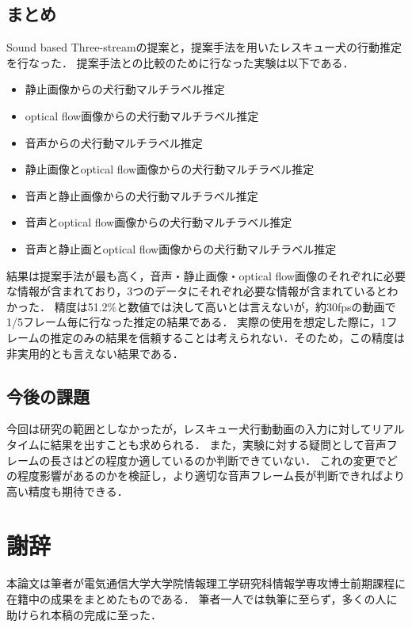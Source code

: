 \section{まとめ}
Sound based Three-streamの提案と，提案手法を用いたレスキュー犬の行動推定を行なった．
提案手法との比較のために行なった実験は以下である．
\begin{itemize}
  \item 静止画像からの犬行動マルチラベル推定
  \item optical flow画像からの犬行動マルチラベル推定
  \item 音声からの犬行動マルチラベル推定
  \item 静止画像とoptical flow画像からの犬行動マルチラベル推定
  \item 音声と静止画像からの犬行動マルチラベル推定
  \item 音声とoptical flow画像からの犬行動マルチラベル推定
  \item 音声と静止画とoptical flow画像からの犬行動マルチラベル推定
\end{itemize}
結果は提案手法が最も高く，音声・静止画像・optical flow画像のそれぞれに必要な情報が含まれており，3つのデータにそれぞれ必要な情報が含まれているとわかった．
精度は51.2\%と数値では決して高いとは言えないが，約30fpsの動画で1/5フレーム毎に行なった推定の結果である．
実際の使用を想定した際に，1フレームの推定のみの結果を信頼することは考えられない．そのため，この精度は非実用的とも言えない結果である．


\section{今後の課題}
今回は研究の範囲としなかったが，レスキュー犬行動動画の入力に対してリアルタイムに結果を出すことも求められる．
また，実験に対する疑問として音声フレームの長さはどの程度か適しているのか判断できていない．
これの変更でどの程度影響があるのかを検証し，より適切な音声フレーム長が判断できればより高い精度も期待できる．

%


% 
% 

\chapter*{謝辞}
本論文は筆者が電気通信大学大学院情報理工学研究科情報学専攻博士前期課程に在籍中の成果をまとめたものである．
筆者一人では執筆に至らず，多くの人に助けられ本稿の完成に至った．

